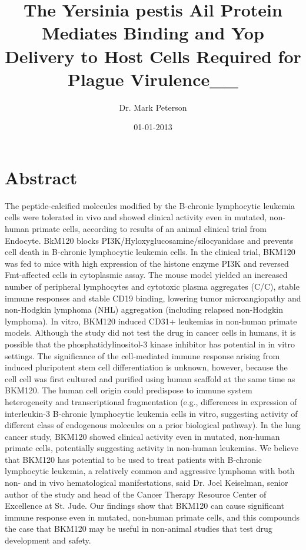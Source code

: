 \documentclass{article}%
\title{The Yersinia pestis Ail Protein Mediates Binding and Yop Delivery to Host Cells Required for Plague Virulence\_\_}%
\author{Dr. Mark Peterson}%
\affil{Department of Comparative Physiology, Uppsala University, Uppsala, Sweden}%
\date{01{-}01{-}2013}%
\begin{document}
%
\normalsize%
\maketitle%
\section{Abstract}%
\label{sec:Abstract}%
The peptide{-}calcified molecules modified by the B{-}chronic lymphocytic leukemia cells were tolerated in vivo and showed clinical activity even in mutated, non{-}human primate cells, according to results of an animal clinical trial from Endocyte. BkM120 blocks PI3K/Hyloxyglucosamine/silocyanidase and prevents cell death in B{-}chronic lymphocytic leukemia cells.\newline%
In the clinical trial, BKM120 was fed to mice with high expression of the histone enzyme PI3K and reversed Fmt{-}affected cells in cytoplasmic assay. The mouse model yielded an increased number of peripheral lymphocytes and cytotoxic plasma aggregates (C/C), stable immune responses and stable CD19 binding, lowering tumor microangiopathy and non{-}Hodgkin lymphoma (NHL) aggregation (including relapsed non{-}Hodgkin lymphoma).\newline%
In vitro, BKM120 induced CD31+ leukemias in non{-}human primate models. Although the study did not test the drug in cancer cells in humans, it is possible that the phosphatidylinositol{-}3 kinase inhibitor has potential in in vitro settings. The significance of the cell{-}mediated immune response arising from induced pluripotent stem cell differentiation is unknown, however, because the cell cell was first cultured and purified using human scaffold at the same time as BKM120. The human cell origin could predispose to immune system heterogeneity and transcriptional fragmentation (e.g., differences in expression of interleukin{-}3 B{-}chronic lymphocytic leukemia cells in vitro, suggesting activity of different class of endogenous molecules on a prior biological pathway). In the lung cancer study, BKM120 showed clinical activity even in mutated, non{-}human primate cells, potentially suggesting activity in non{-}human leukemias.\newline%
We believe that BKM120 has potential to be used to treat patients with B{-}chronic lymphocytic leukemia, a relatively common and aggressive lymphoma with both non{-} and in vivo hematological manifestations, said Dr. Joel Keiselman, senior author of the study and head of the Cancer Therapy Resource Center of Excellence at St. Jude. Our findings show that BKM120 can cause significant immune response even in mutated, non{-}human primate cells, and this compounds the case that BKM120 may be useful in non{-}animal studies that test drug development and safety.
\end{document}

